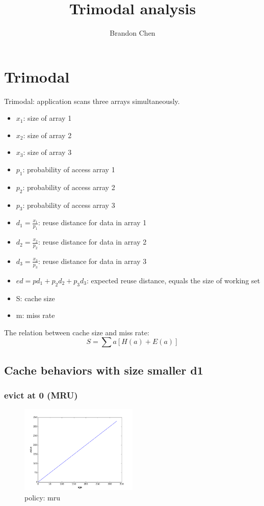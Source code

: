 \documentclass[12pt, letterpaper]{article}
\title{Trimodal analysis}
\author{Brandon Chen}
\begin{document}
\maketitle
\section{Trimodal}

Trimodal: application scans three arrays simultaneously.

\begin{itemize}
\item $x_1$: size of array 1
\item $x_2$: size of array 2
\item $x_3$: size of array 3
\item $p_1$: probability of access array 1
\item $p_2$: probability of access array 2
\item $p_3$: probability of access array 3
\item $d_1 = \frac{x_1}{p_1}$: reuse distance for data in array 1
\item $d_2 = \frac{x_2}{p_2}$: reuse distance for data in array 2
\item $d_3 = \frac{x_3}{p_3}$: reuse distance for data in array 3
\item $ed = p d_1 + p_2 d_2 + p_3 d_3 $: expected reuse distance, equals the
size of working set 
\item S: cache size
\item m: miss rate
\end{itemize}

The relation between cache size and miss rate:
\begin{equation}
S = \sum a [H(a) + E(a)]
\end{equation}

\subsection{Cache behaviors with size smaller d1}

\subsubsection{evict at 0 (MRU)}

\begin{figure}[H]
\centering
\includegraphics[width=0.5\textwidth]{mru_value}
\caption{policy: mru}
\end{figure}
\end{document}
